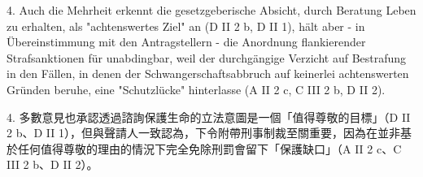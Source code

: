 \documentclass[12pt]{article}
\begin{document}
\syncleft
\begin{sourcepara}
4. Auch die Mehrheit erkennt die gesetzgeberische Absicht, durch Beratung Leben zu erhalten, als "achtenswertes Ziel" an (D II 2 b, D II 1), hält aber - in Übereinstimmung mit den Antragstellern - die Anordnung flankierender Strafsanktionen für unabdingbar, weil der durchgängige Verzicht auf Bestrafung in den Fällen, in denen der Schwangerschaftsabbruch auf keinerlei achtenswerten Gründen beruhe, eine "Schutzlücke" hinterlasse (A II 2 c, C III 2 b, D II 2).
\end{sourcepara}
\begin{transpara}
4. 多數意見也承認透過諮詢保護生命的立法意圖是一個「值得尊敬的目標」（D II 2 b、D II 1），但與聲請人一致認為，下令附帶刑事制裁至關重要，因為在並非基於任何值得尊敬的理由的情況下完全免除刑罰會留下「保護缺口」（A II 2 c、C III 2 b、D II 2）。
\end{transpara}
\end{document}
